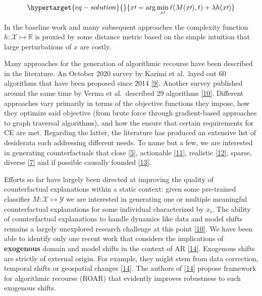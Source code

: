 \documentclass[
  conference]{IEEEtran}
\begin{document}
\begin{equation}\protect\hypertarget{eq-solution}{}{
x\prime = \arg \min_{x\prime}  \ell(M(x\prime),t) + \lambda h(x\prime)
}\label{eq-solution}\end{equation}

In the baseline work and many subsequent approaches the complexity
function \(h: \mathcal{X} \mapsto \mathbb{R}\) is proxied by some
distance metric based on the simple intuition that large perturbations
of \(x\) are costly.

Many approaches for the generation of algorithmic recourse have been
described in the literature. An October 2020 survey by Karimi et
al.~layed out 60 algorithms that have been proposed since 2014
\protect\hyperlink{ref-karimi2020survey}{{[}9{]}}. Another survey
published around the same time by Verma et al.~described 29 algorithms
\protect\hyperlink{ref-verma2020counterfactual}{{[}10{]}}. Different
approaches vary primarily in terms of the objective functions they
impose, how they optimize said objective (from brute force through
gradient-based approaches to graph traversal algorithms), and how the
ensure that certain requirements for CE are met. Regarding the latter,
the literature has produced an extensive list of desiderata each
addressing different needs. To name but a few, we are interested in
generating counterfactuals that close
\protect\hyperlink{ref-wachter2017counterfactual}{{[}5{]}}, actionable
\protect\hyperlink{ref-ustun2019actionable}{{[}11{]}}, realistic
\protect\hyperlink{ref-schut2021generating}{{[}12{]}}, sparse, diverse
\protect\hyperlink{ref-mothilal2020explaining}{{[}7{]}} and if possible
causally founded
\protect\hyperlink{ref-karimi2021algorithmic}{{[}13{]}}.

Efforts so far have largely been directed at improving the quality of
counterfactual explanations within a static context: given some
pre-trained classifier \(M: \mathcal{X} \mapsto \mathcal{Y}\) we are
interested in generating one or multiple meaningful counterfactual
explanations for some individual characterized by \(x_i\). The ability
of counterfactual explanations to handle dynamics like data and model
shifts remains a largely unexplored research challenge at this point
\protect\hyperlink{ref-verma2020counterfactual}{{[}10{]}}. We have been
able to identify only one recent work that considers the implications of
\textbf{exogenous} domain and model shifts in the context of AR
\protect\hyperlink{ref-upadhyay2021towards}{{[}14{]}}. Exogenous shifts
are strictly of external origin. For example, they might stem from data
correction, temporal shifts or geospatial changes
\protect\hyperlink{ref-upadhyay2021towards}{{[}14{]}}. The authors of
\protect\hyperlink{ref-upadhyay2021towards}{{[}14{]}} propose framework
for algorithmic recourse (ROAR) that evidently improves robustness to
such exogenous shifts.
\end{document}
